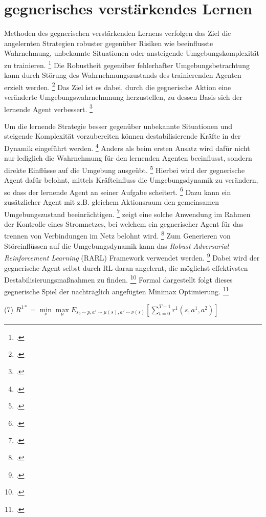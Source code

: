 \section{gegnerisches verstärkendes Lernen}

Methoden des gegnerischen verstärkenden Lernens verfolgen das Ziel die angelernten Strategien robuster gegenüber Risiken wie beeinflusste Wahrnehmung, unbekannte Situationen oder ansteigende Umgebungskomplexität zu trainieren. \footcite[Vgl.][S. 2]{Schott}
Die Robustheit gegenüber fehlerhafter Umgebungsbetrachtung kann durch Störung des Wahrnehmungszustands des trainierenden Agenten erzielt werden. \footcite[Vgl.][S. 2]{Schott}
Das Ziel ist es dabei, durch die gegnerische Aktion eine veränderte Umgebungswahrnehmnung herzustellen, zu dessen Basis sich der lernende Agent verbessert. \footcite[Vgl.][S. 3]{Schoot}

Um die lernende Strategie besser gegenüber unbekannte Situationen und steigende Komplexität vorzubereiten können destabilisierende Kräfte in der Dynamik eingeführt werden. \footcite[Vgl.][S. 1]{Pinto}
Anders als beim ersten Ansatz wird dafür nicht nur lediglich die Wahrnehmung für den lernenden Agenten beeinflusst, sondern direkte Einflüsse auf die Umgebung ausgeübt. \footcite[Vgl.][S. 2]{Schott}
Hierbei wird der gegnerische Agent dafür belohnt, mittels Kräfteinfluss die Umgebungsdynamik zu verändern, so dass der lernende Agent an seiner Aufgabe scheitert. \footcite[Vgl.][S. 2]{Pinto}
Dazu kann ein zusätzlicher Agent mit z.B. gleichem Aktionsraum den gemeinsamen Umgebungszustand beeinrächtigen. \footcite[Vgl.][S. 2]{Pinto}
\cite[]{Pan} zeigt eine solche Anwendung im Rahmen der Kontrolle eines Stromnetzes, bei welchem ein gegnerischer Agent für das trennen von Verbindungen im Netz belohnt wird. \footcite[Vgl.][S. 2]{Pan}
Zum Generieren von Störeinflüssen auf die Umgebungsdynamik kann das \textit{Robust Adversarial Reinforcement Learning} (RARL) Framework verwendet werden. \footcite[Vgl.][S. 2]{Schott}
Dabei wird der gegnerische Agent selbst durch RL daran angelernt, die möglichst effektivsten Destabilisierungsmaßnahmen zu finden. \footcite[Vgl.][S. 1]{Pinto}
Formal dargestellt folgt dieses gegnerische Spiel der nachträglich angefügten Minimax Optimierung. \footcite[Vgl.][S. 3]{Pinto}
\begin{description}
    \item \begin{center} (7) $R^{1*} = \underset{\nu}{\min}\underset{\mu}{\max} E_{s_{0}\sim p,a^{1}\sim\mu(s),a^{2}\sim\nu(s)} [\sum_{t=0}^{T-1} r^{1} (s,a^{1},a^{2})]$ \end{center} 
\end{description}
